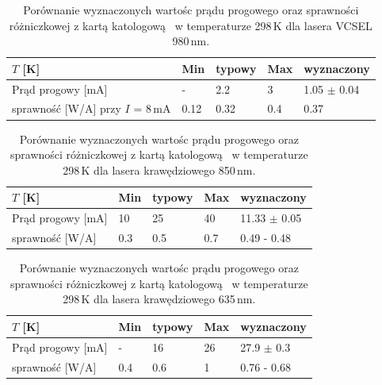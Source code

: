 \begin{table}[h!]
\begin{center}
\label{tab:tabela2}
\caption{Porównanie wyznaczonych wartośc prądu progowego oraz sprawności różniczkowej z kartą katologową~\cite{spec_vcsel_980}
 w temperaturze 298\,K dla lasera VCSEL 980\,nm. }
\begin{tabular}{ | C{3.5cm}|  C{1.5cm} | C{1.5cm} | C{1.5cm}| C{3.5cm}|}
\hline
$T$ [K]           &   Min  & typowy & Max   & wyznaczony        \\ \hline
Prąd progowy [mA] &  -    &  2.2    & 3    & 1.05 $\pm$ 0.04  \\ \hline
sprawność [W/A]  przy $I$ = 8\,mA   &  0.12   &  0.32   & 0.4   & 0.37      \\ \hline
\end{tabular}
\end{center}
\end{table}

\begin{table}[h!]
\begin{center}
\label{tab:tabela3}
\caption{Porównanie wyznaczonych wartośc prądu progowego oraz sprawności różniczkowej z kartą katologową~\cite{spec_edge_850}
 w temperaturze 298\,K dla lasera krawędziowego 850\,nm. }
\begin{tabular}{ | C{3.5cm}|  C{1.5cm} | C{1.5cm} | C{1.5cm}| C{3.5cm}|}
\hline
$T$ [K]           &   Min  & typowy & Max   & wyznaczony        \\ \hline
Prąd progowy [mA] &  10    &  25    & 40    & 11.33 $\pm$ 0.05  \\ \hline
sprawność [W/A]     &  0.3   &  0.5   & 0.7   & 0.49 - 0.48       \\ \hline
\end{tabular}
\end{center}
\end{table}

\begin{table}[h!]
\begin{center}
\label{tab:tabela4}
\caption{Porównanie wyznaczonych wartośc prądu progowego oraz sprawności różniczkowej z kartą katologową~\cite{spec_edge_635}
 w temperaturze 298\,K dla lasera krawędziowego 635\,nm. }
\begin{tabular}{ | C{3.5cm}|  C{1.5cm} | C{1.5cm} | C{1.5cm}| C{3.5cm}|}
\hline
$T$ [K]           &   Min  & typowy & Max   & wyznaczony        \\ \hline
Prąd progowy [mA] &  -    &  16    & 26    & 27.9 $\pm$ 0.3  \\ \hline
sprawność [W/A]      &  0.4   &  0.6   & 1  & 0.76 - 0.68       \\ \hline
\end{tabular}
\end{center}
\end{table}
